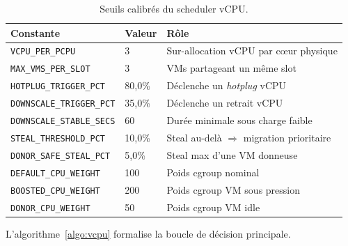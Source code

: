 \begin{table}[H]
\centering
\small
\caption{Seuils calibrés du scheduler vCPU.}
\begin{tabular}{llp{6.5cm}}
\toprule
\textbf{Constante} & \textbf{Valeur} & \textbf{Rôle} \\
\midrule
\texttt{VCPU\_PER\_PCPU}          & 3      & Sur-allocation vCPU par cœur physique \\
\texttt{MAX\_VMS\_PER\_SLOT}      & 3      & VMs partageant un même slot \\
\texttt{HOTPLUG\_TRIGGER\_PCT}    & 80,0\% & Déclenche un \emph{hotplug} vCPU \\
\texttt{DOWNSCALE\_TRIGGER\_PCT}  & 35,0\% & Déclenche un retrait vCPU \\
\texttt{DOWNSCALE\_STABLE\_SECS}  & 60     & Durée minimale sous charge faible \\
\texttt{STEAL\_THRESHOLD\_PCT}    & 10,0\% & Steal au-delà $\Rightarrow$ migration prioritaire \\
\texttt{DONOR\_SAFE\_STEAL\_PCT}  & 5,0\%  & Steal max d'une VM donneuse \\
\texttt{DEFAULT\_CPU\_WEIGHT}     & 100    & Poids cgroup nominal \\
\texttt{BOOSTED\_CPU\_WEIGHT}     & 200    & Poids cgroup VM sous pression \\
\texttt{DONOR\_CPU\_WEIGHT}       & 50     & Poids cgroup VM idle \\
\bottomrule
\end{tabular}

\label{tab:vcpu-seuils}
\end{table}

L'algorithme~\ref{algo:vcpu} formalise la boucle de décision principale.

\begin{algorithm}[H]
\caption{Boucle d'ajustement vCPU par VM (\texttt{VcpuScheduler::tick})}
\label{algo:vcpu}
\end{algorithm}

